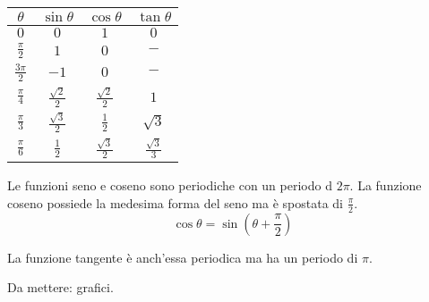\documentclass[a4paper]{article}
\begin{document}
\begin{center}
    \bgroup{}
    \def\arraystretch{1.25}
    \begin{tabular}{|c|c|c|c|}
        \hline
        \(\theta\) & \(\sin\theta\) & \(\cos\theta\) & \(\tan\theta\) \\
        \hline
        \(0\) & \(0\) & \(1\) & \(0\) \\
        \hline
        \(\frac{\pi}{2}\) & \(1\) & \(0\) & \(-\) \\
        \hline
        \(\frac{3\pi}{2}\) & \(-1\) & \(0\) & \(-\) \\
        \hline
        \(\frac{\pi}{4}\) & \(\frac{\sqrt{2}}{2}\) & \(\frac{\sqrt{2}}{2}\) & \(1\) \\
        \hline
        \(\frac{\pi}{3}\) & \(\frac{\sqrt{3}}{2}\) & \(\frac{1}{2}\) & \(\sqrt{3}\) \\
        \hline
        \(\frac{\pi}{6}\) & \(\frac{1}{2}\) & \(\frac{\sqrt{3}}{2}\) & \(\frac{\sqrt{3}}{3}\) \\
        \hline
    \end{tabular}
    \egroup{}
\end{center}

Le funzioni seno e coseno sono periodiche con un periodo d \(2\pi\).
La funzione coseno possiede la medesima forma del seno ma è spostata di \(\frac{\pi}{2}\).
\[
    \cos\theta = \sin\left(\theta + \frac{\pi}{2}\right)
\]

La funzione tangente è anch'essa periodica ma ha un periodo di \(\pi\).

Da mettere: grafici.
\end{document}
